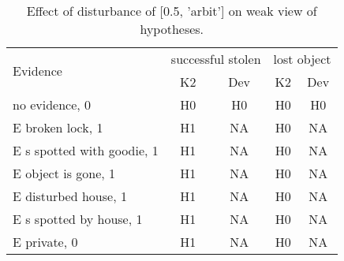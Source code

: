 \begin{table}\begin{tabular}{l|cc|cc}\toprule\multirow{2}{*}{Evidence} & \multicolumn{2}{c}{successful stolen}& \multicolumn{2}{c}{lost object}\\& {K2} & {Dev}& {K2} & {Dev}\\\midrule
no evidence, 0 & H0&H0&H0&H0\\E broken lock, 1 & \cellcolor{Bittersweet}H1&\cellcolor{Bittersweet}NA&\cellcolor{Bittersweet}H0&\cellcolor{Bittersweet}NA\\E s spotted with goodie, 1 & \cellcolor{Bittersweet}H1&\cellcolor{Bittersweet}NA&\cellcolor{Bittersweet}H0&\cellcolor{Bittersweet}NA\\E object is gone, 1 & \cellcolor{Bittersweet}H1&\cellcolor{Bittersweet}NA&\cellcolor{Bittersweet}H0&\cellcolor{Bittersweet}NA\\E disturbed house, 1 & \cellcolor{Bittersweet}H1&\cellcolor{Bittersweet}NA&\cellcolor{Bittersweet}H0&\cellcolor{Bittersweet}NA\\E s spotted by house, 1 & \cellcolor{Bittersweet}H1&\cellcolor{Bittersweet}NA&\cellcolor{Bittersweet}H0&\cellcolor{Bittersweet}NA\\E private, 0 & \cellcolor{Bittersweet}H1&\cellcolor{Bittersweet}NA&\cellcolor{Bittersweet}H0&\cellcolor{Bittersweet}NA\\\bottomrule\end{tabular}\caption{Effect of disturbance of [0.5, 'arbit'] on weak view of hypotheses.}\end{table}